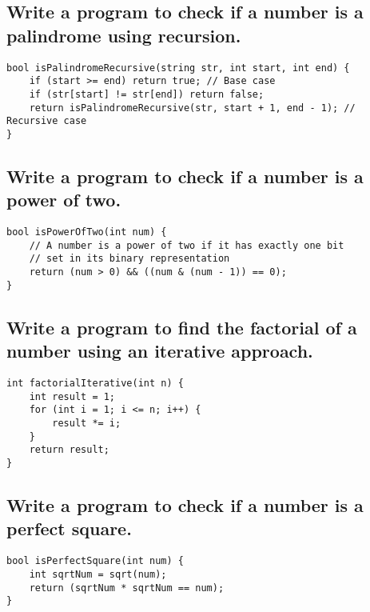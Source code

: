 \subsection{Write a program to check if a number is a palindrome using recursion.}
\begin{tcolorbox}[title=]
\begin{verbatim}
bool isPalindromeRecursive(string str, int start, int end) {
    if (start >= end) return true; // Base case
    if (str[start] != str[end]) return false;
    return isPalindromeRecursive(str, start + 1, end - 1); // Recursive case
}
\end{verbatim}
\end{tcolorbox}


\subsection{Write a program to check if a number is a power of two.}
\begin{tcolorbox}[title=]
\begin{verbatim}
bool isPowerOfTwo(int num) {
    // A number is a power of two if it has exactly one bit 
    // set in its binary representation
    return (num > 0) && ((num & (num - 1)) == 0);
}
\end{verbatim}
\end{tcolorbox}


\subsection{Write a program to find the factorial of a number using an iterative approach.}
\begin{tcolorbox}[title=]
\begin{verbatim}
int factorialIterative(int n) {
    int result = 1;
    for (int i = 1; i <= n; i++) {
        result *= i;
    }
    return result;
}
\end{verbatim}
\end{tcolorbox}


\subsection{Write a program to check if a number is a perfect square.}
\begin{tcolorbox}[title=]
\begin{verbatim}
bool isPerfectSquare(int num) {
    int sqrtNum = sqrt(num);
    return (sqrtNum * sqrtNum == num);
}
\end{verbatim}
\end{tcolorbox}


